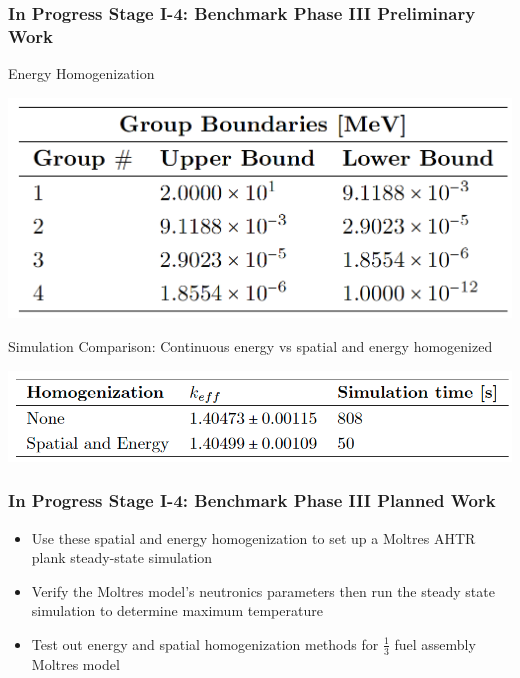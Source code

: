 \begin{frame}
    \frametitle{In Progress Stage I-4: Benchmark Phase III Preliminary Work}
    \begin{block}{Energy Homogenization}
        \begin{table}[]
            \centering
            \begin{minipage}[c]{0.6\textwidth}
                \centering
                \includegraphics[width=0.9\linewidth]{figures/ahtr-energy-discr.png}
            \end{minipage}\hfill
            \begin{minipage}[c]{0.4\textwidth}
            \caption{4-group energy structures for AHTR geometry 
            derived by \cite{gentry_development_2016}.}
        \end{minipage}
        \end{table}
    \end{block}
    \vspace{-0.3cm}
    \begin{block}{Simulation Comparison: Continuous energy vs spatial 
        and energy homogenized}
        \begin{table}[]
                \centering
                \includegraphics[width=0.7\linewidth]{figures/ahtr-homogenization.png}
            \caption{
                AHTR fuel slab's $k_{eff}$ for case with continuous energy and 
                space and case with spatial and energy homogenization.}
        \end{table}
    \end{block}
\end{frame}

\begin{frame}
    \frametitle{In Progress Stage I-4: Benchmark Phase III Planned Work}
    \begin{itemize}
        \item Use these spatial and energy homogenization to set up a 
        Moltres AHTR plank steady-state simulation 
        \item Verify the Moltres model's neutronics parameters then run 
        the steady state simulation to determine maximum temperature 
        \item Test out energy and spatial homogenization methods for $\frac{1}{3}$
        fuel assembly Moltres model 
    \end{itemize}
\end{frame}